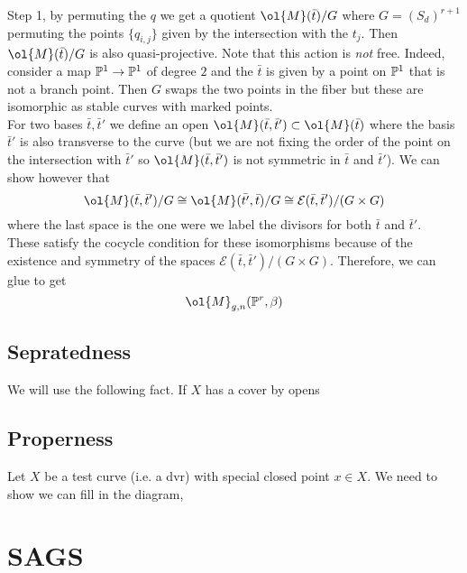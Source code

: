 \documentclass[12pt]{article}
\begin{document}
Step 1, by permuting the $q$ we get a quotient $\ol{M}(\bar{t})/G$ where $G = (S_d)^{r+1}$ permuting the points $\{ q_{i,j} \}$ given by the intersection with the $t_j$.  Then $\ol{M}(\bar{t})/G$ is also quasi-projective. Note that this action is \textit{not} free. Indeed, consider a map $\P^1 \to \P^1$ of degree $2$ and the $\bar{t}$ is given by a point on $\P^1$ that is not a branch point. Then $G$ swaps the two points in the fiber but these are isomorphic as stable curves with marked points. 
\bigskip\\
For two bases $\bar{t}, \bar{t}'$ we define an open $\ol{M}(\bar{t}, \bar{t}') \subset \ol{M}(\bar{t})$ where the basis $\bar{t}'$ is also transverse to the curve (but we are not fixing the order of the point on the intersection with $\bar{t}'$ so $\ol{M}(\bar{t}, \bar{t}')$ is not symmetric in $\bar{t}$ and $\bar{t}'$). We can show however that
\[ \ol{M}(\bar{t}, \bar{t}')/G \cong \ol{M}(\bar{t'}, \bar{t})/G \cong \mathcal{E}(\bar{t}, \bar{t}')/(G \times G) \]
where the last space is the one were we label the divisors for both $\bar{t}$ and $\bar{t}'$. 
\bigskip\\
These satisfy the cocycle condition for these isomorphisms because of the existence and symmetry of the spaces $\mathcal{E}(\bar{t}, \bar{t}')/(G \times G)$. Therefore, we can glue to get 
\[ \ol{M}_{g,n}(\P^r, \beta) \]

\subsection{Sepratedness}

We will use the following fact. If $X$ has a cover by opens 

\subsection{Properness}

Let $X$ be a test curve (i.e. a dvr) with special closed point $x \in X$. We need to show we can fill in the diagram,
\begin{center}
\end{center}

\section{SAGS}
\end{document}
